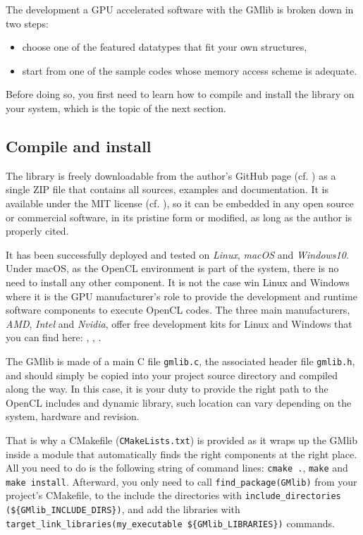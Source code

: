 \documentclass[a4paper,12pt]{article}
\begin{document}
The development a GPU accelerated software with the GMlib is broken down in two steps:

\begin{itemize}
\item choose one of the featured datatypes that fit your own structures,
\item start from one of the sample codes whose memory access scheme is adequate.
\end{itemize}

Before doing so, you first need to learn how to compile and install the library on your system, which is the topic of the next section.

\subsection{Compile and install}

The library is freely downloadable from the author's GitHub page (cf. \cite{gmlib}) as a single ZIP file that contains all sources, examples and documentation.
It is available under the MIT license (cf. \cite{MIT}), so it can be embedded in any open source or commercial software, in its pristine form or modified, as long as the author is properly cited.

It has been successfully deployed and tested on \emph{Linux}, \emph{macOS} and \emph{Windows10}.
Under macOS, as the OpenCL environment is part of the system, there is no need to install any other component.
It is not the case win Linux and Windows where it is the GPU manufacturer's role to provide the development and runtime software components to execute OpenCL codes.
The three main manufacturers, \emph{AMD}, \emph{Intel} and \emph{Nvidia}, offer free development kits for Linux and Windows that you can find here: \cite{driver_amd}, \cite{driver_intel}, \cite{driver_nvidia}.

The GMlib is made of a main C file {\tt gmlib.c}, the associated header file {\tt gmlib.h}, and should simply be copied into your project source directory and compiled along the way.
In this case, it is your duty to provide the right path to the OpenCL includes and dynamic library, such location can vary depending on the system, hardware and revision.

That is why a CMakefile ({\tt CMakeLists.txt}) is provided as it wraps up the GMlib inside a module that automatically finds the right components at the right place.
All you need to do is the following string of command lines: {\tt cmake .}, {\tt make} and {\tt make install}.
Afterward, you only need to call {\tt find\_package(GMlib)} from your project's CMakefile, to the include the directories with {\tt include\_directories (\$\{GMlib\_INCLUDE\_DIRS\})}, and add the libraries with {\tt target\_link\_libraries(my\_executable \$\{GMlib\_LIBRARIES\})} commands.
\end{document}
